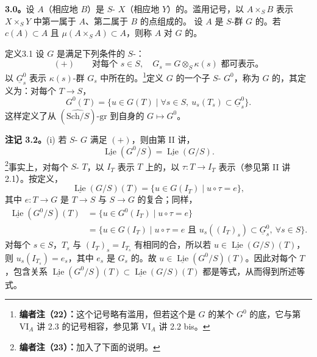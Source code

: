 \textbf{3.0。}设 $A$（相应地 $B$）是 $S$- $X$（相应地 $Y$）的。滥用记号，以 $A\times_SB$ 表示 $X\times_SY$ 中第一属于 $A$、第二属于 $B$ 的点组成的。
设 $A$ 是 $S$-群 $G$ 的。若 $c(A)\subset A$ 且 $\mu(A\times_SA)\subset A$，则称 $A$ 对 $G$ 的。
\begin{SGAresult}{定义}{3.1}
设 $G$ 是满足下列条件的 $S$-：
\[
(+)\qquad\text{对每个 }s\in S,\quad G_s=G\otimes_S\kappa(s)\text{ 都可表示。}
\]
以 $\underline G_s^0$ 表示 $\kappa(s)$-群 $G_s$ 中所在的。\footnote{\textbf{编者注（22）：}这个记号略有滥用，但若这个是 $G$ 的某个 $G^0$ 的底，它与第 VI$_A$ 讲 2.3 的记号相容，参见第 VI$_A$ 讲 2.2 bis。}定义 $G$ 的一个子 $S$- $G^0$，称为 $G$ 的，其定义为：对每个 $T\to S$，
\[
G^0(T)=\{u\in G(T)\mid\forall s\in S,\ u_s(T_s)\subset\underline G_s^0\}.
\]
这样定义了从 $(\widehat{\mathrm{Sch}/S})\text{-}\mathrm{gr}$ 到自身的 $G\mapsto G^0$。
\end{SGAresult}
\textbf{注记 3.2。}(i) 若 $S$- $G$ 满足 $(+)$，则由第 II 讲，
\[
\underline{\operatorname{Lie}}(G^0/S)=\underline{\operatorname{Lie}}(G/S).
\]
\footnote{\textbf{编者注（23）：}加入了下面的说明。}事实上，对每个 $S$- $T$，以 $I_T$ 表示 $T$ 上的，以 $\tau:T\to I_T$ 表示（参见第 II 讲 2.1）。按定义，
\[
\underline{\operatorname{Lie}}(G/S)(T)=\{u\in G(I_T)\mid u\circ\tau=e\},
\]
其中 $e:T\to G$ 是 $T\to S$ 与 $S\to G$ 的复合；同样，
\begin{align*}
\underline{\operatorname{Lie}}(G^0/S)(T)
&=\{u\in G^0(I_T)\mid u\circ\tau=e\}\\
&=\{u\in G(I_T)\mid u\circ\tau=e\text{ 且 }u_s((I_T)_s)\subset\underline G_s^0,\ \forall s\in S\}.
\end{align*}
对每个 $s\in S$，$T_s$ 与 $(I_T)_s=I_{T_s}$ 有相同的合，所以若 $u\in\underline{\operatorname{Lie}}(G/S)(T)$，则 $u_s(I_{T_s})=e_s$，其中 $e_s$ 是 $G_s$ 的。故 $u\in\underline{\operatorname{Lie}}(G^0/S)(T)$。因此对每个 $T$，包含关系 $\underline{\operatorname{Lie}}(G^0/S)(T)\subset\underline{\operatorname{Lie}}(G/S)(T)$ 都是等式，从而得到所述等式。

